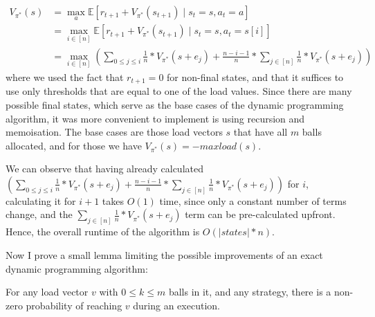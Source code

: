 \begin{equation} \label{eq:twothinning-dynamicprogramming}
\begin{split}
    V_{\pi^*}(s) &= \max_a \mathbb{E} [r_{t+1} + V_{\pi^*}(s_{t+1}) \mid s_t=s, a_t=a] \\
    &= \max_{i \in [n]} \mathbb{E} [r_{t+1} + V_{\pi^*}(s_{t+1}) \mid s_t=s, a_t=s[i]] \\
    &= \max_{i \in [n]} (\sum_{0\leq j \leq i} \frac{1}{n}*V_{\pi^*}(s+e_j) + \frac{n-i-1}{n} * \sum_{j \in [n]} \frac{1}{n}*V_{\pi^*}(s+e_j))
\end{split}
\end{equation}
where we used the fact that $r_{t+1}=0$ for non-final states, and that it suffices to use only thresholds that are equal to one of the load values. Since there are many possible final states, which serve as the base cases of the dynamic programming algorithm, it was more convenient to implement is using recursion and memoisation. The base cases are those load vectors $s$ that have all $m$ balls allocated, and for those we have $V_{\pi^*}(s)=-maxload(s)$. 


We can observe that having already calculated $(\sum_{0\leq j \leq i} \frac{1}{n}*V_{\pi^*}(s+e_j) + \frac{n-i-1}{n} * \sum_{j \in [n]} \frac{1}{n}*V_{\pi^*}(s+e_j))$ for $i$, calculating it for $i+1$ takes $O(1)$ time, since only a constant number of terms change, and the $\sum_{j \in [n]} \frac{1}{n}*V_{\pi^*}(s+e_j)$ term can be pre-calculated upfront. Hence, the overall runtime of the algorithm is $O(|states|*n)$.\


Now I prove a small lemma limiting the possible improvements of an exact dynamic programming algorithm:


\begin{lemma} \label{lemma: everystatereachable}
For any load vector $v$ with $0\leq k\leq m$ balls in it, and any strategy, there is a non-zero probability of reaching $v$ during an execution.
\end{lemma}

